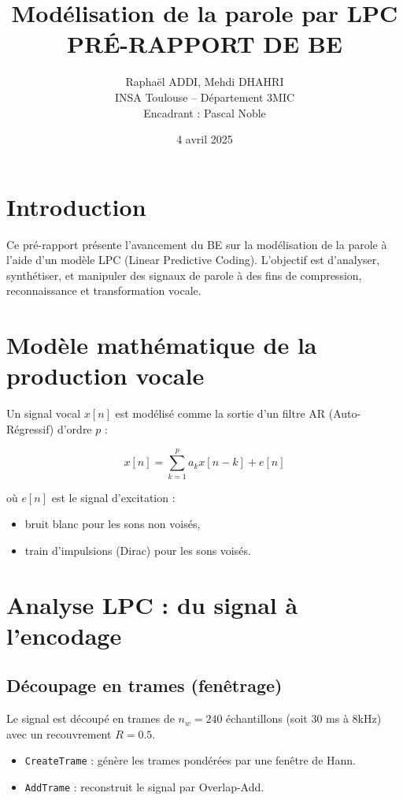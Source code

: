 \documentclass[11pt]{article}
\title{Modélisation de la parole par LPC \\[0.5em]
\large PRÉ-RAPPORT DE BE}
\author{Raphaël ADDI, Mehdi DHAHRI \\
INSA Toulouse – Département 3MIC \\
Encadrant : Pascal Noble}
\date{4 avril 2025}
\begin{document}
\maketitle
\thispagestyle{empty}
\newpage

\tableofcontents
\newpage

\section{Introduction}

Ce pré-rapport présente l’avancement du BE sur la modélisation de la parole à l’aide d’un modèle LPC (Linear Predictive Coding). L’objectif est d’analyser, synthétiser, et manipuler des signaux de parole à des fins de compression, reconnaissance et transformation vocale.

\section{Modèle mathématique de la production vocale}

Un signal vocal \( x[n] \) est modélisé comme la sortie d’un filtre AR (Auto-Régressif) d’ordre \( p \) :

\[
x[n] = \sum_{k=1}^{p} a_k x[n-k] + e[n]
\]

où \( e[n] \) est le signal d’excitation :
\begin{itemize}
    \item bruit blanc pour les sons non voisés,
    \item train d’impulsions (Dirac) pour les sons voisés.
\end{itemize}

\section{Analyse LPC : du signal à l'encodage}

\subsection{Découpage en trames (fenêtrage)}

Le signal est découpé en trames de \( n_w = 240 \) échantillons (soit 30 ms à 8kHz) avec un recouvrement \( R = 0.5 \).

\begin{itemize}
    \item \texttt{CreateTrame} : génère les trames pondérées par une fenêtre de Hann.
    \item \texttt{AddTrame} : reconstruit le signal par Overlap-Add.
\end{itemize}
\end{document}
